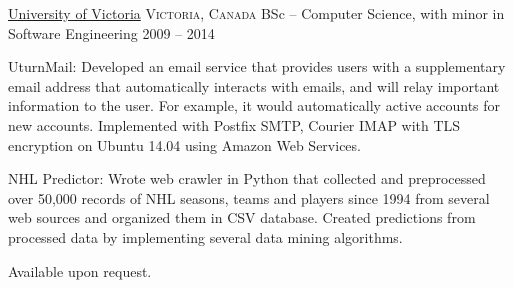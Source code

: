 \documentclass[10pt,a4paper]{article}
\begin{document}
\vspace{2em}
\spacedhrule{0em}{-0.4em}


\headedsection
  {\href{https://www.uvic.ca/}{University of Victoria}}
  {\textsc{Victoria, Canada}} {
  \headedsubsection
    {BSc -- Computer Science, with minor in Software Engineering}
    {2009 -- 2014}
    {}
}

\spacedhrule{0.5em}{-0.4em}

\inlineheadsection
  {UturnMail:}
  {Developed an email service that provides users with a supplementary
email address that automatically interacts with emails, and will relay important information to the user. For example, it would automatically active accounts for new accounts.
Implemented with Postfix SMTP, Courier IMAP with TLS encryption on Ubuntu 14.04 using Amazon Web Services.}

\vspace{0.5em}
\inlineheadsection
  {NHL Predictor:}
  {Wrote web crawler in Python that collected and preprocessed over
50,000 records of NHL seasons, teams and players since 1994 from several web sources and organized them
in CSV database. Created predictions from processed data by implementing several data mining algorithms.}

\vspace{2em}
\spacedhrule{0em}{-0.4em}


\inlineheadsection
  {Available upon request.}
\end{document}
